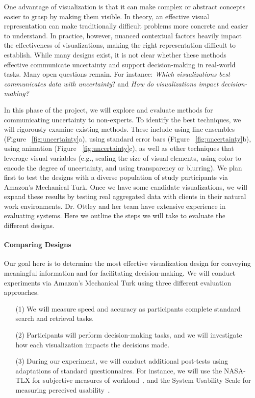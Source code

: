 One advantage of visualization is that it can make complex or abstract concepts easier to grasp by making them visible. In theory, an effective visual representation can make traditionally difficult problems more concrete and easier to understand. 
In practice, however, nuanced contextual factors heavily impact the effectiveness of visualizations, making the right representation difficult to establish.
While many designs exist, it is not clear whether these methods effective communicate uncertainty and support decision-making in real-world tasks.
Many open questions remain. For instance: \textit{Which visualizations best communicates data with uncertainty}? and \textit{How do
visualizations impact decision-making?}

In this phase of the project, we will explore and evaluate methods for communicating uncertainty to non-experts.
To identify the best techniques, we will rigorously examine existing methods. 
These include using line ensembles (Figure ~\ref{fig:uncertainty}a), using standard error bars (Figure ~\ref{fig:uncertainty}b), using animation (Figure ~\ref{fig:uncertainty}c), as well as other techniques that leverage visual variables (e.g., scaling the size of visual elements, using color to encode the degree of uncertainty, and using transparency or blurring). 
We plan first to test the designs with a diverse population of study participants via Amazon's Mechanical Turk. 
Once we have some candidate visualizations, we will expand these results by testing real aggregated data with clients in their natural work environments.
Dr. Ottley and her team have extensive experience in evaluating systems.
Here we outline the steps we will take to evaluate the different designs.   

\paragraph{Comparing Designs} 
Our goal here is to determine the most effective visualization design for conveying meaningful information and for facilitating decision-making.  
We will conduct experiments via Amazon's Mechanical Turk using three different evaluation approaches.
\begin{itemize}
\item[(1)] We will measure speed and accuracy as participants complete standard search and retrieval tasks.
\item[(2)] Participants will perform decision-making tasks, and we will investigate how each visualization impacts the decisions made.
\item[(3)] During our experiment, we will conduct additional post-tests using adaptations of standard questionnaires. For instance, we will use the NASA-TLX for subjective measures of workload~\cite{hart1988development}, and the System Usability Scale for measuring perceived usability~\cite{bangor2008empirical}. 
\end{itemize}

